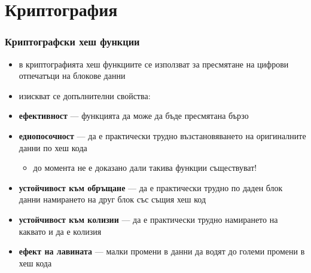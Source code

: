 \documentclass[alsotrans]{beamerswitch}
\begin{document}
\section{Криптография}

\begin{frame}
  \frametitle{Криптографски хеш функции}
  \begin{itemize}[<+->]
  \item в криптографията хеш функциите се използват за пресмятане на
    цифрови отпечатъци на блокове данни
  \item изискват се допълнителни свойства:
  \item \textbf{ефективност} ---  функцията да може да бъде пресмятана бързо
  \item \textbf{еднопосочност} ---  да е практически трудно възстановяването на оригиналните данни по хеш кода
    \begin{itemize}
    \item \alert{до момента не е доказано дали такива функции съществуват!}
    \end{itemize}
  \item \textbf{устойчивост към обръщане} --- да е практически трудно по даден блок данни намирането на друг блок със същия хеш код
  \item \textbf{устойчивост към колизии} --- да е практически трудно намирането на каквато и да е колизия
  \item \textbf{ефект на лавината} --- малки промени в данни да водят до големи промени в хеш кода
  \end{itemize}
\end{frame}
\end{document}

